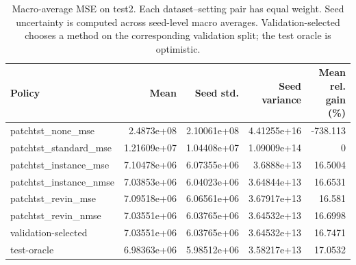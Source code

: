 \begin{table}[htbp]
\centering
\caption{Macro-average MSE on test2. Each dataset--setting pair has equal weight. Seed uncertainty is computed across seed-level macro averages. Validation-selected chooses a method on the corresponding validation split; the test oracle is optimistic.}
\begin{tabular}{lrrrr}
\toprule
Policy & Mean & Seed std. & Seed variance & Mean rel. gain (\%) \\
\midrule
patchtst\_none\_mse & 2.4873e+08 & 2.10061e+08 & 4.41255e+16 & -738.113 \\
patchtst\_standard\_mse & 1.21609e+07 & 1.04408e+07 & 1.09009e+14 & 0 \\
patchtst\_instance\_mse & 7.10478e+06 & 6.07355e+06 & 3.6888e+13 & 16.5004 \\
patchtst\_instance\_nmse & 7.03853e+06 & 6.04023e+06 & 3.64844e+13 & 16.6531 \\
patchtst\_revin\_mse & 7.09518e+06 & 6.06561e+06 & 3.67917e+13 & 16.581 \\
patchtst\_revin\_nmse & 7.03551e+06 & 6.03765e+06 & 3.64532e+13 & 16.6998 \\
validation-selected & 7.03551e+06 & 6.03765e+06 & 3.64532e+13 & 16.7471 \\
\midrule
test-oracle & 6.98363e+06 & 5.98512e+06 & 3.58217e+13 & 17.0532 \\
\bottomrule
\end{tabular}
\end{table}
